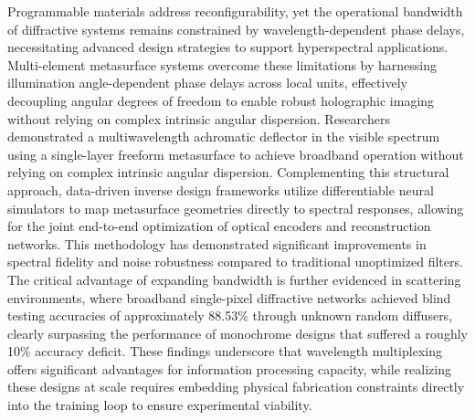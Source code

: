 \documentclass[11pt]{article}
\begin{document}
Programmable materials address reconfigurability, yet the operational bandwidth of diffractive systems remains constrained by wavelength-dependent phase delays, necessitating advanced design strategies to support hyperspectral applications. Multi-element metasurface systems overcome these limitations by harnessing illumination angle-dependent phase delays across local units, effectively decoupling angular degrees of freedom to enable robust holographic imaging without relying on complex intrinsic angular dispersion. Researchers demonstrated a multiwavelength achromatic deflector in the visible spectrum using a single-layer freeform metasurface to achieve broadband operation without relying on complex intrinsic angular dispersion. \citep{doi_10_1021_acs_nanolett_4c02995_4955c826} Complementing this structural approach, data-driven inverse design frameworks utilize differentiable neural simulators to map metasurface geometries directly to spectral responses, allowing for the joint end-to-end optimization of optical encoders and reconstruction networks. This methodology has demonstrated significant improvements in spectral fidelity and noise robustness compared to traditional unoptimized filters. The critical advantage of expanding bandwidth is further evidenced in scattering environments, where broadband single-pixel diffractive networks achieved blind testing accuracies of approximately 88.53\% through unknown random diffusers, clearly surpassing the performance of monochrome designs that suffered a roughly 10\% accuracy deficit. These findings underscore that wavelength multiplexing offers significant advantages for information processing capacity, while realizing these designs at scale requires embedding physical fabrication constraints directly into the training loop to ensure experimental viability. \citep{doi_10_2528_pier25052305_11655dbe} \citep{s2_76a83ea3baed75ad88b7f0782eb9a694a330c853_cee16cac} \citep{doi_10_1038_s41377_023_01116_3_aba67a18}
\end{document}
